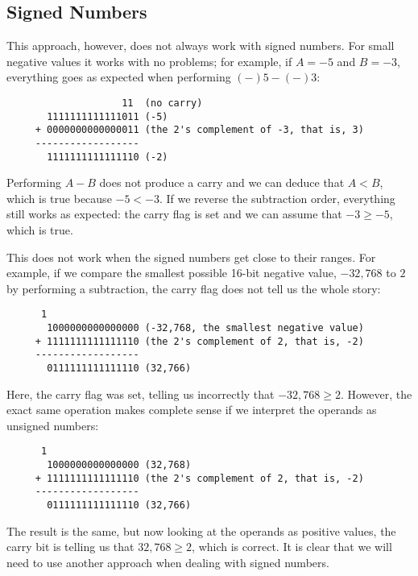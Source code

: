 \subsection{Signed Numbers}\label{signed-numbers}

This approach, however, does not always work with signed numbers. For
small negative values it works with no problems; for example, if $A=-5$
and $B=-3$, everything goes as expected when performing $(-)5 - (-)3$:

\begin{verbatim}
                    11  (no carry)
       1111111111111011 (-5)
     + 0000000000000011 (the 2's complement of -3, that is, 3)
     ------------------
       1111111111111110 (-2) 
\end{verbatim}

Performing $A-B$ does not produce a carry and we can deduce that
$A < B$, which is true because $-5 < -3$. If we reverse the subtraction
order, everything still works as expected: the carry flag is set and we
can assume that $-3 \geq -5$, which is true.

This does not work when the signed numbers get close to their ranges.
For example, if we compare the smallest possible 16-bit negative value,
$-32,768$ to $2$ by performing a subtraction, the carry flag does not
tell us the whole story:

\begin{verbatim}
      1
       1000000000000000 (-32,768, the smallest negative value)
     + 1111111111111110 (the 2's complement of 2, that is, -2)
     ------------------
       0111111111111110 (32,766) 
\end{verbatim}

Here, the carry flag was set, telling us incorrectly that
$-32,768 \geq 2$. However, the exact same operation makes complete sense
if we interpret the operands as unsigned numbers:

\begin{verbatim}
      1
       1000000000000000 (32,768)
     + 1111111111111110 (the 2's complement of 2, that is, -2)
     ------------------
       0111111111111110 (32,766) 
\end{verbatim}

The result is the same, but now looking at the operands as positive
values, the carry bit is telling us that $32,768 \geq 2$, which is
correct. It is clear that we will need to use another approach when
dealing with signed numbers.
